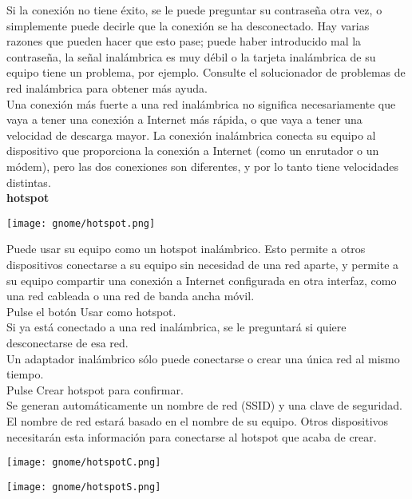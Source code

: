 \begin{itemize}
Si la conexión no tiene éxito, se le puede preguntar su contraseña otra vez, o simplemente puede decirle que la conexión se ha desconectado. Hay varias razones que pueden hacer que esto pase; puede haber introducido mal la contraseña, la señal inalámbrica es muy débil o la tarjeta inalámbrica de su equipo tiene un problema, por ejemplo. Consulte el solucionador de problemas de red inalámbrica para obtener más ayuda.\\

Una conexión más fuerte a una red inalámbrica no significa necesariamente que vaya a tener una conexión a Internet más rápida, o que vaya a tener una velocidad de descarga mayor. La conexión inalámbrica conecta su equipo al dispositivo que proporciona la conexión a Internet (como un enrutador o un módem), pero las dos conexiones son diferentes, y por lo tanto tiene velocidades distintas.\\

{\large \bf hotspot}
\begin{center}
\texttt{[image: gnome/hotspot.png]} 
\end{center}
Puede usar su equipo como un hotspot inalámbrico. Esto permite a otros dispositivos conectarse a su equipo sin necesidad de una red aparte, y permite a su equipo compartir una conexión a Internet configurada en otra interfaz, como una red cableada o una red de banda ancha móvil.\\

Pulse el botón Usar como hotspot.\\
Si ya está conectado a una red inalámbrica, se le preguntará si quiere desconectarse de esa red.\\
Un adaptador inalámbrico sólo puede conectarse o crear una única red al mismo tiempo.\\
Pulse Crear hotspot para confirmar.\\

Se generan automáticamente un nombre de red (SSID) y una clave de seguridad. El nombre de red estará basado en el nombre de su equipo. Otros dispositivos necesitarán esta información para conectarse al hotspot que acaba de crear.\\
\newpage
\begin{multicols}{2}
\texttt{[image: gnome/hotspotC.png]}

\texttt{[image: gnome/hotspotS.png]}
\end{multicols}
\end{itemize}

